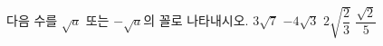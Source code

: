 다음 수를 $\sqrt{a}$ 또는 $-\sqrt{a}$의 꼴로 나타내시오.
 $3\sqrt{7}$
 $-4\sqrt{3}$
 $2\sqrt{\dfrac{2}{3}}$
 $\dfrac{\sqrt{2}}{5}$
